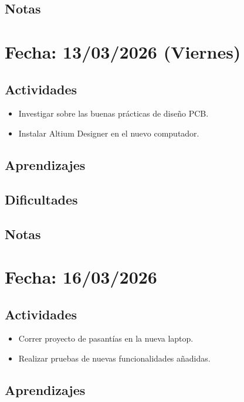 \documentclass[12pt, a4paper]{article}
\begin{document}
    \subsection*{Notas}

    \section*{Fecha: 13/03/2026 (Viernes)}

    \subsection*{Actividades}

    \begin{itemize}
        \item Investigar sobre las buenas prácticas de diseño PCB.
        \item Instalar Altium Designer en el nuevo computador.
    \end{itemize}

    \subsection*{Aprendizajes}

    \subsection*{Dificultades}

    \subsection*{Notas}

    \section*{Fecha: 16/03/2026}

    \subsection*{Actividades}

    \begin{itemize}
        \item Correr proyecto de pasantías en la nueva laptop.
        \item Realizar pruebas de nuevas funcionalidades añadidas.
    \end{itemize}

    \subsection*{Aprendizajes}
\end{document}
